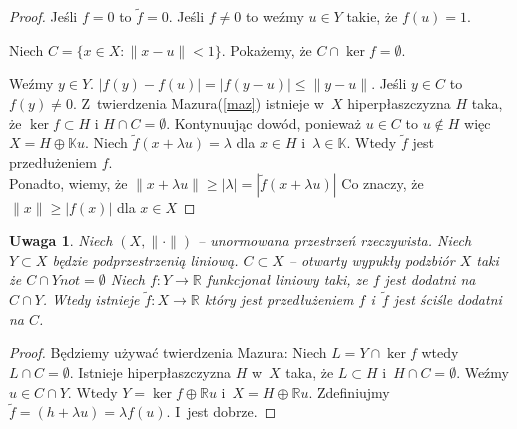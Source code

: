 \documentclass[10pt]{article}
\renewcommand{\[}{\begin{equation}}
\renewcommand{\]}{\end{equation}}
\newcommand{\R}{{\ensuremath{\mathbb R}}}
\newcommand{\K}{\ensuremath{\mathbb{K}}}
\newcommand{\norm}{\|\cdot\|}
\newtheorem{uw}[subsubsection]{Uwaga}
\begin{document}
\begin{proof}
  Jeśli $f=0$ to $\tilde{f} = 0$. Jeśli $f\not =0$ to weźmy $u \in Y$  takie, że $f(u)=1$.\par
	Niech $C =\{ x \in X: \|x - u\|<1\}$. Pokażemy, że $C\cap \ker f = \emptyset$.\par
	Weźmy $y\in Y$.
	$|f(y)-f(u)|=|f(y-u)|\le \|y - u\|$. Jeśli $y\in C$ to  $f(y) \not =0$.
	Z~{twierdzenia Mazura(\ref{maz})} istnieje w~$X$ hiperpłaszczyzna $H$ taka, że $\ker f\subset H$ i $H\cap C = \emptyset$.
	Kontynuując dowód, ponieważ $u\in C$ to $u \not \in H$ więc $X=H\oplus \K u$.
	Niech $\tilde{f}(x+\lambda u) = \lambda$ dla $x\in H$ i~$\lambda \in \K$. Wtedy $\tilde{f}$ jest  przedłużeniem $f$.\\
	Ponadto, wiemy, że $\|x +\lambda u\|\ge |\lambda| = |\tilde{f} (x+\lambda u)|$ Co znaczy, że $\|x\| \ge |f(x)|$ dla $x\in X$
\end{proof}
\begin{uw}
	Niech $(X,\norm)$ -- unormowana przestrzeń rzeczywista. Niech $Y\subset X$ będzie podprzestrzenią liniową.
	$C\subset X$ -- otwarty wypukły podzbiór $X$ taki że $C \cap Y not = \emptyset $ Niech $f:Y\to \R$ funkcjonał liniowy taki, ze  
	$f$ jest dodatni na $C\cap Y$. Wtedy istnieje $\tilde{f} : X \to \R$ który jest przedłużeniem $f$ i~$\tilde{f}$ jest ściśle dodatni na $C$.
\end{uw}
\begin{proof}
	Będziemy używać twierdzenia Mazura: Niech $L= Y \cap \ker f$ wtedy $L\cap C = \emptyset$. 
	Istnieje hiperpłaszczyzna $H$ w~$X$ taka, że $L\subset H$ i~$H\cap C = \emptyset$.
	Weźmy $u \in C \cap Y$. Wtedy $Y = \ker f \oplus \R u$ i~$X = H\oplus \R u$.
	Zdefiniujmy $\tilde{f} = (h+\lambda u) = \lambda f(u)$. I~jest dobrze. 
\end{proof}
\end{document}

